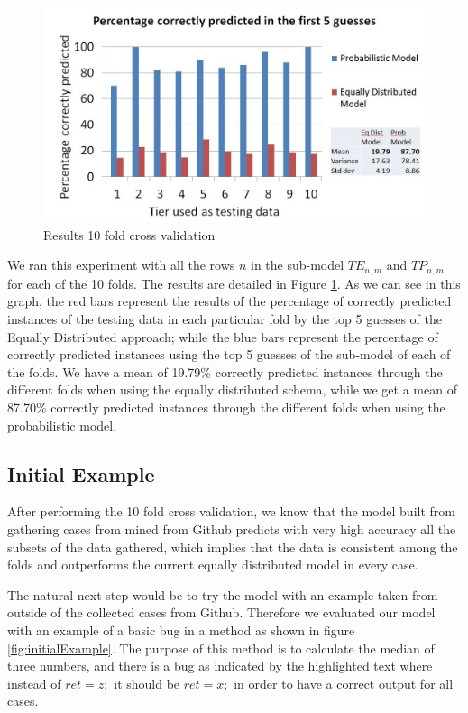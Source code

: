 \documentclass[conference]{IEEEtran}
\begin{document}
\begin{figure}[!h]
  \centering
    \includegraphics[scale=0.33]{sanity1}
  \caption{Results 10 fold cross validation}
  \label{fig:results10fcv}
\end{figure}

We ran this experiment with all the rows $n$ in the sub-model $TE_{n,m}$ and 
$TP_{n,m}$ for each of the 10 
folds. The results are detailed in Figure \ref{fig:results10fcv}. As we can see 
in this graph, the red bars represent the results of the percentage of correctly 
predicted instances of the testing data in each particular fold by the top 5 guesses of the Equally Distributed approach; while the blue 
bars represent the percentage of correctly predicted instances using the top 5 
guesses of the sub-model of each of the folds. We have a mean of 19.79\% 
correctly predicted instances through the different folds when using the equally 
distributed schema, while we get a mean of 87.70\% correctly predicted instances 
through the different folds when using the probabilistic model. 





\subsection{Initial Example}
After performing the 10 fold cross validation, we know that the model built from 
gathering cases from mined from Github predicts with very high accuracy all the 
subsets of the data gathered, which implies that the data is consistent among 
the folds and outperforms the current equally distributed model in every case. 

The natural next step would be to try the model with an example taken from 
outside of the collected cases from Github. Therefore we evaluated our model 
with an example of a basic bug in a method as shown in figure 
\ref{fig:initialExample}. The purpose of this method is to calculate the median 
of three numbers, and there is a bug as indicated by the highlighted text where 
instead of $ret = z;$ it should be $ret = x;$ in order to have a correct output 
for all cases.
\end{document}
